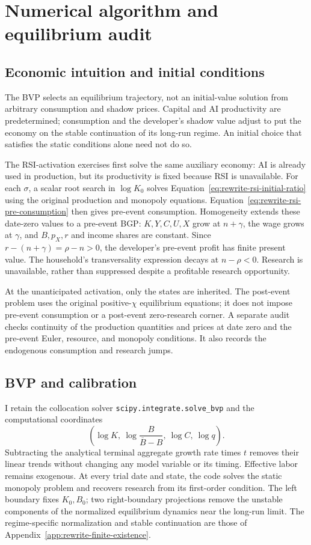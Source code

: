 \section{Numerical algorithm and equilibrium audit}
\label{app:rewrite-algorithm}

\subsection{Economic intuition and initial conditions}

The BVP selects an equilibrium trajectory, not an initial-value solution
from arbitrary consumption and shadow prices. Capital and AI productivity
are predetermined; consumption and the developer's shadow value adjust
to put the economy on the stable continuation of its long-run regime.
An initial choice that satisfies the static conditions alone need not do so.

The RSI-activation exercises first solve the same auxiliary economy:
AI is already used in production, but its productivity is fixed because RSI
is unavailable. For each $\sigma$, a scalar root search in $\log K_0$
solves Equation~\eqref{eq:rewrite-rsi-initial-ratio} using the original
production and monopoly equations. Equation~\eqref{eq:rewrite-rsi-pre-consumption}
then gives pre-event consumption. Homogeneity extends these date-zero
values to a pre-event BGP: $K,Y,C,U,X$ grow at $n+\gamma$, the wage grows
at $\gamma$, and $B,p_X,r$ and income shares are constant. Since
$r-(n+\gamma)=\rho-n>0$, the developer's pre-event profit has finite
present value. The household's transversality expression decays at
$n-\rho<0$. Research is unavailable, rather than suppressed despite a
profitable research opportunity.

At the unanticipated activation, only the states are inherited. The
post-event problem uses the original positive-$\chi$ equilibrium equations;
it does not impose pre-event consumption or a post-event zero-research
corner. A separate audit checks continuity of the production quantities
and prices at date zero and the pre-event Euler, resource, and monopoly
conditions. It also records the endogenous consumption and research jumps.

\subsection{BVP and calibration}

I retain the collocation solver \texttt{scipy.integrate.solve\_bvp} and
the computational coordinates
\[
 \left(\log K,\ \log\frac{B}{\overline B-B},\ \log C,\ \log q\right).
\]
Subtracting the analytical terminal aggregate growth rate times $t$ removes
their linear trends without changing any model variable or its timing.
Effective labor remains exogenous. At every trial date and state, the code
solves the static monopoly problem and recovers research from its first-order
condition. The left boundary fixes $K_0,B_0$; two right-boundary projections
remove the unstable components of the normalized equilibrium dynamics near
the long-run limit. The regime-specific normalization and stable continuation
are those of Appendix~\ref{app:rewrite-finite-existence}.


